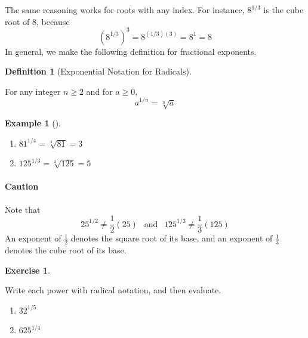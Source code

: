 \documentclass[10pt,]{book}
\theoremstyle{plain}
\theoremstyle{definition}
\newtheorem{definition}[theorem]{Definition}
\theoremstyle{definition}
\theoremstyle{definition}
\newtheorem{example}[theorem]{Example}
\theoremstyle{definition}
\theoremstyle{definition}
\newtheorem{exercise}[theorem]{Exercise}
\numberwithin{equation}{section}
\begin{document}
    The same reasoning works for roots with any index. For instance, \(8^{1/3}\) is the cube root of \(8\), because
    \begin{equation*}\left(8^{1/3}\right)^3 = 8^{(1/3)(3)} = 8^1 = 8\end{equation*}
    In general, we make the following definition for fractional exponents.
%
\begin{definition}[Exponential Notation for Radicals]\label{definition-5}
%
\par

    For any integer \(n \ge 2\) and for \(a \ge 0\),
    \begin{equation*}a^{1/n} = \sqrt[n]{a}\end{equation*}
%
\end{definition}
\begin{example}[]\label{example-exponential-notation2}
\leavevmode%
\begin{enumerate}[label=*\alph**]
\item\hypertarget{li-475}{}\(81^{1/4} = \sqrt[4]{81} = 3\)\item\hypertarget{li-476}{}\(125^{1/3} = \sqrt[3]{125} = 5\)\end{enumerate}
\end{example}
\typeout{************************************************}
\typeout{************************************************}
\paragraph[Caution]{Caution}\label{paragraphs-48}

    Note that 
    \begin{equation*}25^{1/2} \ne \frac{1}{2}(25) ~~ \text{ and } ~~ 125^{1/3} \ne \frac{1}{3}(125)\end{equation*}
    An exponent of \(\frac{1}{2}\) denotes the square root of its base, and an exponent of \(\frac{1}{3}\) denotes the cube root of its base.
%
\begin{exercise}\label{exercise-exponential-notation2}

        Write each power with radical notation, and then evaluate.
        \leavevmode%
\begin{enumerate}[label=*\alph**]
\item\hypertarget{li-477}{}\( 32^{1/5}\)\item\hypertarget{li-478}{}\( 625^{1/4}\)\end{enumerate}

\end{exercise}
\par
\end{document}
